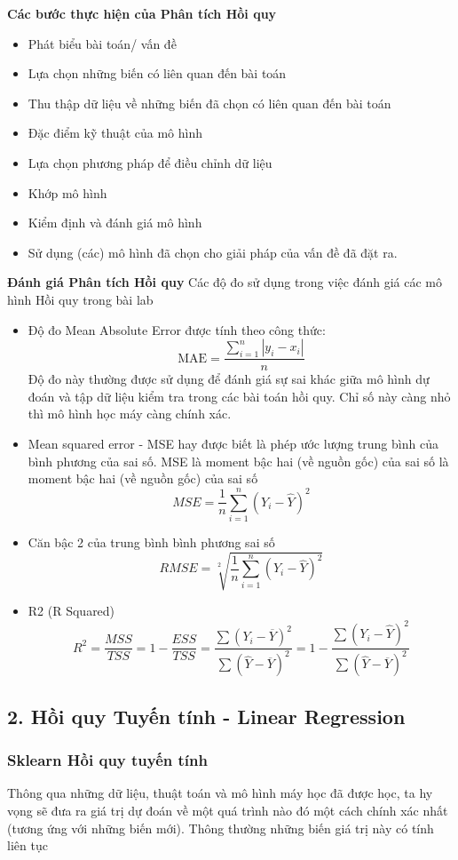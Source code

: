 \documentclass{article}
\begin{document}
	\textbf{Các bước thực hiện của Phân tích Hồi quy}
	\begin{itemize}
		\item Phát biểu bài toán/ vấn đề
		\item Lựa chọn những biến có liên quan đến bài toán
		\item Thu thập dữ liệu về những biến đã chọn có liên quan đến bài toán
		\item Đặc điểm kỹ thuật của mô hình
		\item Lựa chọn phương pháp để điều chỉnh dữ liệu
		\item Khớp mô hình
		\item Kiểm định và đánh giá mô hình
		\item Sử dụng (các) mô hình đã chọn cho giải pháp của vấn đề đã đặt ra.
	\end{itemize}

	\textbf{Đánh giá Phân tích Hồi quy}
	Các độ đo sử dụng trong việc đánh giá các mô hình Hồi quy trong bài lab
	\begin{itemize}
		\item Độ đo Mean Absolute Error được tính theo công thức:
		$$\text{MAE} = \frac{\sum_{i=1}^n|y_i-x_i|}{n}$$
		Độ đo này thường được sử dụng để đánh giá sự sai khác giữa mô hình dự đoán và tập dữ liệu kiểm tra trong các bài toán hồi quy. Chỉ số này càng nhỏ thì mô hình học máy càng chính xác.
		\item Mean squared error - MSE hay được biết là phép ước lượng trung bình của bình phương của sai số. MSE là moment bậc hai (về nguồn gốc) của sai số là moment bậc hai (về nguồn gốc) của sai số
		$$MSE = \frac{1}{n}\sum_{i=1}^{n}(Y_i - \hat{Y})^2$$
		\item Căn bậc 2 của trung bình bình phương sai số
		$$RMSE = \sqrt[2]{\frac{1}{n}\sum_{i=1}^{n}(Y_i - \hat{Y})^2}$$
		\item R2 (R Squared)
		$$R^2 = \frac{MSS}{TSS} = 1 - \frac{ESS}{TSS} = \frac{\sum(Y_i - \overline{Y})^2}{\sum(\hat{Y} - \overline{Y})^2} = 1 - \frac{\sum(Y_i - \hat{Y})^2}{\sum(\hat{Y} - \overline{Y})^2}$$
	\end{itemize}
	
	
	\subsection{2. Hồi quy Tuyến tính - Linear Regression}
	\subsubsection{Sklearn Hồi quy tuyến tính}
	\qquad Thông qua những dữ liệu, thuật toán và mô hình máy học đã được học, ta hy vọng sẽ đưa ra giá trị dự đoán về một quá trình nào đó một cách chính xác nhất (tương ứng với những biến mới). Thông thường những biến giá trị này có tính liên tục
	
\end{document}
